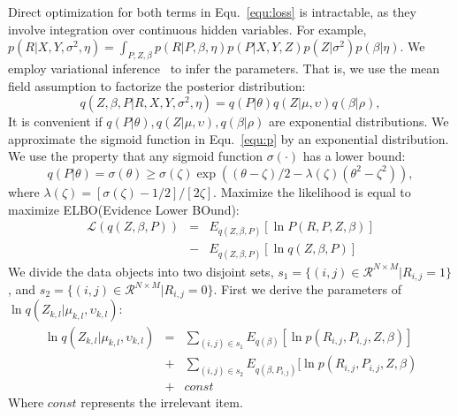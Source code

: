 \documentclass[journal]{IEEEtran}
\begin{document}
Direct optimization for both terms in Equ.~\ref{equ:loss} is intractable, as they involve integration over continuous hidden variables. For example, $p(R|X,Y,\sigma^2,\eta)=\int_{P,Z,\beta} p(R|P,\beta,\eta) p(P|X,Y,Z) p(Z|\sigma^2) p(\beta|\eta) $. We employ variational inference~\cite{Variational} to infer the parameters. That is, we use the mean field assumption to factorize the posterior distribution: 
\begin{equation}
    q(Z,\beta,P|R,X,Y,\sigma^{2},\eta) = q(P|\theta)q(Z|\mu,\upsilon)q(\beta|\rho),
\end{equation}
It is convenient if $q(P|\theta),q(Z|\mu,\upsilon),q(\beta|\rho)$ are exponential distributions. We approximate the sigmoid function in Equ.~\ref{equ:p} by an exponential distribution. We use the property that any sigmoid function $\sigma(\cdot)$ has a lower bound:
\begin{equation}
q(P|\theta)=\sigma(\theta)\geq \sigma(\zeta)\exp{((\theta-\zeta)/2-\lambda(\zeta)(\theta^2-\zeta^2))},
\end{equation}
where $\lambda(\zeta)=[\sigma(\zeta)-1/2]/[2\zeta]$.
Maximize the likelihood is equal to maximize ELBO(Evidence Lower BOund):
\begin{eqnarray}\label{elbo}
    \mathcal{L}(q(Z,\beta ,P)) &=& E_{q(Z,\beta ,P)}[\ln P(R,P,Z,\beta)] \nonumber \\ &-&E_{q(Z,\beta,P)}[\ln q(Z,\beta,P)]
\end{eqnarray}
We divide the data objects into two disjoint sets, $s_1 = \{(i,j)\in \mathcal{R}^{N\times M}|R_{i,j}=1\}$, and $s_2= \{(i,j)\in \mathcal{R}^{N\times M}|R_{i,j}=0\}$.
First we derive the parameters of $\ln{q(Z_{k,l}|\mu_{k,l},\upsilon_{k,l})}$:
\begin{eqnarray*}
    \ln q(Z_{k,l}|\mu_{k,l},\upsilon_{k,l}) 
    &=& \sum_{(i,j)\in s_1}E_{q(\beta)}[\ln p(R_{i,j},P_{i,j},Z,\beta)]  \\
    &+& \sum_{(i,j)\in s_2}E_{q(\beta,P_{i,j})}[\ln p(R_{i,j},P_{i,j},Z,\beta) \\
    &+& const
\end{eqnarray*}
Where $const$ represents the irrelevant item.
\end{document}
